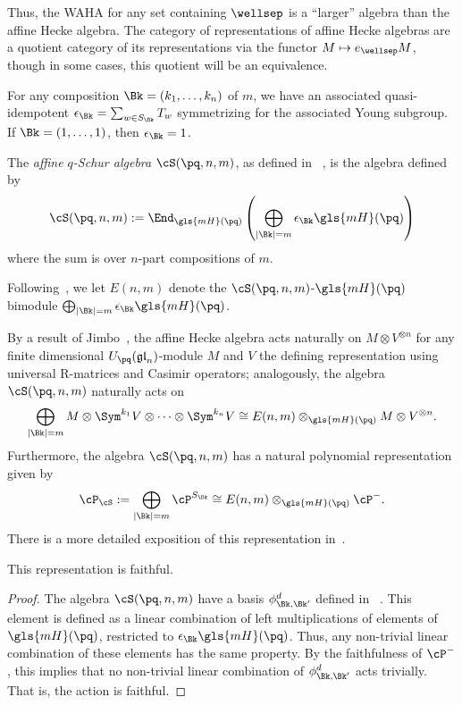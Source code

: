Thus, the WAHA for any set containing $\wellsep$ is a ``larger'' algebra than the affine Hecke
algebra. The category of representations of affine Hecke algebras are
a quotient category of its representations via the functor $M\mapsto e_{\wellsep}M$, though in some cases, this
quotient will be an equivalence. 

For any composition $\Bk=(k_1,\dots, k_n)$ of $m$, we have an associated
quasi-idempotent $\epsilon_{\Bk}=\sum_{w\in S_{\Bk}}T_w$ symmetrizing for the associated Young
subgroup. If $\Bk=(1,\dots, 1)$, then $\epsilon_{\Bk}=1$.

\begin{defi}\label{def:cS}
 The \emph{affine $q$-Schur algebra} $\cS(\pq,n,m)$, as defined in
~\cite[Def.~2.1.4]{GreenSchur}, is the algebra defined
 by
 \[\cS(\pq,n,m):=
 \End_{\gls{mH}(\pq)}\left(\bigoplus_{|\Bk|=m}\epsilon_{\Bk}\gls{mH}(\pq)
 \right)%
 \] where the sum is over $n$-part compositions of $m$.
\end{defi}
Following~\cite{GreenSchur}, we let $E(n,m)$ denote the $\cS(\pq,n,m)$-$\gls{mH}(\pq)$ bimodule $\bigoplus_{|\Bk|=m}\epsilon_{\Bk}\gls{mH}(\pq)$.


By a result of Jimbo~\cite{Jimbo}, the affine Hecke algebra acts naturally on $M\otimes V^{\otimes n}$ for any finite
dimensional $U_{\pq}(\mathfrak{gl}_n)$-module $M$ and $V$ the defining
representation using universal R-matrices and Casimir operators; analogously, the
algebra $\cS(\pq,n,m)$ naturally acts on
\[\bigoplus _{|\Bk|=m}M\otimes \Sym^{ k_1}V\otimes \cdots\otimes
\Sym^{k_n}V\cong E(n,m)\otimes_{\gls{mH}(\pq)}M\otimes V^{\otimes n}.\]
Furthermore, the algebra $\cS(\pq,n,m)$ has a natural 
polynomial representation given by
\[\cP_{\cS}:=\bigoplus_{|\Bk|=m}
 \cP^{S_{\Bk}}\cong E(n,m)\otimes_{\gls{mH}(\pq)}\cP^-.\]
There is a more detailed exposition of this representation in~\cite[\S~4]{MiSt}.
\begin{lemma}
 This representation is faithful.
\end{lemma}
\begin{proof}
 The algebra $\cS(\pq,n,m)$ have a basis $\phi^d_{\Bk,\Bk'}$ defined in
~\cite[Def.~2.2.3]{GreenSchur}. This element is defined as a linear
 combination of left multiplications of elements of $\gls{mH}(\pq)$,
 restricted to $\epsilon_{\Bk}\gls{mH}(\pq)$. Thus, any non-trivial linear
 combination of these elements has the same property.
 By the faithfulness of
 $\cP^-$, this implies that no non-trivial linear combination of
 $\phi^d_{\Bk,\Bk'}$ acts trivially. That is, the action is
 faithful. 
\end{proof}


